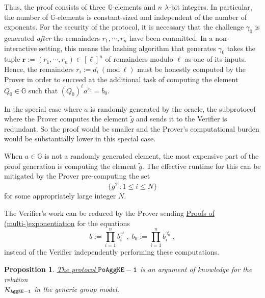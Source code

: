 \documentclass[11pt, lettersize, notitlepage, leqno, footskip=0.6cm]{article}
\newcommand{\pl}{\prod\limits}
\newcommand{\bG}{\mathbb{G}}
\newcommand{\wti}{\widetilde}
\newcommand{\mc}{\mathcal}
\newcommand{\mb}{\mathbb}
\newcommand{\mbf}{\mathbf}
\newcommand{\lam}{\lambda}
\newcommand{\vs}{\vspace{-0.15cm}}
\newcommand{\Mod}[1]{\ (\mathrm{mod}\ #1)}
\newtheorem{Prop}[Thm]{Proposition}
\numberwithin{equation}{section}
\begin{document}
Thus, the proof consists of three $\mb{G}$-elements and $n$ $\lam$-bit integers. In particular, the number of $\mb{G}$-elements is constant-sized and independent of the number of exponents. For the security of the protocol, it is necessary that the challenge $\gamma_{0}$ is generated \textit{after} the remainders $r_1,\cdots,r_n$ have been committed. In a non-interactive setting, this means the hashing algorithm that generates $\gamma_{0}$ takes the tuple $\mbf{r}:= (r_1,\cdots,r_n)\in [\ell]^n$ of remainders modulo $\ell$ as one of its inputs. Hence, the remainders $r_i:= d_i\Mod{\ell}$ must be honestly computed by the Prover in order to succeed at the additional task of computing the element $Q_0\in\mb{G}$ such that $(Q_0)^{\ell}a^{r_0} = b_0$.

In the special case where $a$ is randomly generated by the oracle, the subprotocol where the Prover computes the element $\wti{g}$ and sends it to the Verifier is redundant. So the proof would be smaller and the Prover's computational burden would be substantially lower in this special case.

When $a\in\bG$ is not a randomly generated element, the most expensive part of the proof generation is computing the element $\wti{g}$. The effective runtime for this can be mitigated by the Prover pre-computing the set \vs $$\{g^{2^i}: 1\leq i \leq N \}$$ for some appropriately large integer $N$.

The Verifier's work can be reduced by the Prover sending \hyperref[sec:multexp]{Proofs of (multi-)exponentiation} for the equations \vs $$b := \pl_{i=1}^n b_i^{\gamma^i}\;,\;b_0 := \pl_{i=1}^n b_i^{\gamma_{0}^i}\;,$$ instead of the Verifier independently performing these computations.


\vspace{0.2cm}

\begin{Prop} \hyperlink{AggKE-1}{The protocol $\tt{PoAggKE-1}$} is an argument of knowledge for the relation\\ $\mc{R}_{{\tt{AggKE-1}}}$ in the generic group model.\end{Prop}
\end{document}
